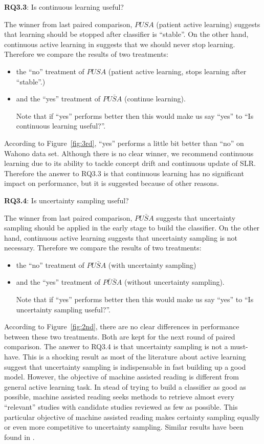 \documentclass[final,twocolumn,5p]{elsarticle}
\theoremstyle{break}
\begin{document}
\textbf{RQ3.3}: Is continuous learning useful?

The winner from last paired comparison, $PUSA$ (patient active learning) suggests that learning should be stopped after classifier is ``stable''. On the other hand, continuous active learning in \cite{cormack2014evaluation} suggests that we should never stop learning. Therefore we compare the results of two treatments:

\begin{itemize}
\item the ``no'' treatment of $PUSA$ (patient active learning, stops learning after ``stable''.)
\item and the ``yes'' treatment of $PU\bar{S}A$ (continue learning). 

Note that if ``yes''
performs better then this would make us say ``yes'' to ``Is continuous learning useful?''.
\end{itemize}

According to Figure~\ref{fig:3rd}, ``yes'' performs a little bit better than ``no'' on Wahono data set. Although there is no clear winner, we recommend continuous learning due to its ability to tackle concept drift and continuous update of SLR. Therefore the answer to RQ3.3 is that continuous learning has no significant impact on performance, but it is suggested because of other reasons.

\textbf{RQ3.4}: Is uncertainty sampling useful?

The winner from last paired comparison, $PU\bar{S}A$ suggests that uncertainty sampling should be applied in the early stage to build the classifier. On the other hand, continuous active learning suggests that uncertainty sampling is not necessary. Therefore we compare the results of two treatments:

\begin{itemize}
\item the ``no'' treatment of $PU\bar{S}A$ (with uncertainty sampling)
\item and the ``yes'' treatment of $P\bar{U}\bar{S}A$ (without uncertainty sampling). 

Note that if ``yes''
performs better then this would make us say ``yes'' to ``Is uncertainty sampling useful?''.
\end{itemize}

According to Figure~\ref{fig:2nd}, there are no clear differences in performance between these two treatments. Both are kept for the next round of paired comparison. The answer to RQ3.4 is that uncertainty sampling is not a must-have. This is a shocking result as most of the literature about active learning suggest that uncertainty sampling is indispensable in fast building up a good model. However, the objective of machine assisted reading is different from general active learning task. In stead of trying to build a classifier as good as possible, machine assisted reading seeks methods to retrieve almost every ``relevant'' studies with candidate studies reviewed as few as possible. This particular objective of machine assisted reading makes certainty sampling equally or even more competitive to uncertainty sampling. Similar results have been found in \cite{cormack2014evaluation}.
\end{document}
